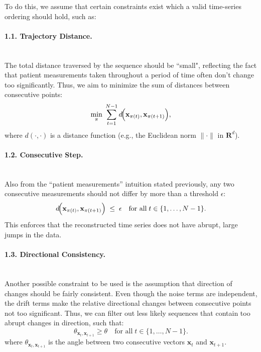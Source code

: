 \documentclass[a4paper, 11pt]{article}
\begin{document}
\begin{sloppypar}
To do this, we assume that certain constraints exist which a valid time-series ordering should
hold, such as:

\paragraph{1.1. Trajectory Distance.}\mbox{}\\
The total distance traversed by the sequence should be ``small", reflecting the fact that
patient measurements taken throughout a period of time often don't change too significantly.
Thus, we aim to minimize the sum of distances between consecutive points:
\[
  \min_{\pi} \; \sum_{t=1}^{N-1}
    d\!\Bigl(\mathbf{x}_{\pi(t)}, \mathbf{x}_{\pi(t+1)}\Bigr),
\]
where \(d(\cdot, \cdot)\) is a distance function (e.g., the Euclidean norm \(\|\cdot\|\) in \(\mathbf{R}^d\)).

\paragraph{1.2. Consecutive Step.}\mbox{}\\
Also from the ``patient measurements'' intuition stated previously, any two consecutive
measurements should not differ by more than a threshold \(\epsilon\):
\[
  d\!\Bigl(\mathbf{x}_{\pi(t)}, \mathbf{x}_{\pi(t+1)}\Bigr) \; \le \; \epsilon
  \quad \text{for all} \; t \in \{1,\dots,N-1\}.
\]
This enforces that the reconstructed time series does not have abrupt, large jumps in the data.

\paragraph{1.3. Directional Consistency.}\mbox{}\\
Another possible constraint to be used is the assumption that direction of changes should 
be fairly consistent. Even though the noise terms are independent, the drift terms make the relative
directional changes between consecutive points not too significant. Thus, we can filter out less likely
sequences that contain too abrupt changes in direction, such that:
\[
  \theta_{\mathbf{x}_t,\mathbf{x}_{t+1}} \ge \theta
  \quad \text{for all} \; t \in \{1,\dots,N-1\}.
\]
where \(\theta_{\mathbf{x}_t,\mathbf{x}_{t+1}}\) is the angle between two consecutive
vectors \(\mathbf{x}_t\) and \(\mathbf{x}_{t+1}\).



\end{sloppypar}
\end{document}
